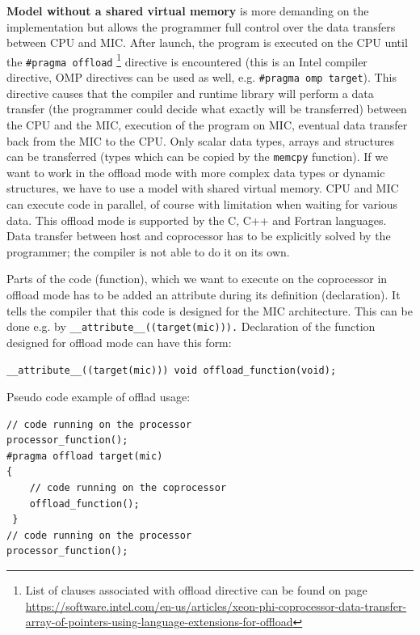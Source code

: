 \par \textbf{Model without a shared virtual memory} is more demanding on the implementation but allows the programmer full control over the data transfers between CPU and MIC. After launch, the program is executed on the CPU until the \texttt{\#pragma offload} \footnote{List of clauses associated with offload directive can be found on page
\url{https://software.intel.com/en-us/articles/xeon-phi-coprocessor-data-transfer-array-of-pointers-using-language-extensions-for-offload}} directive is encountered (this is an Intel compiler directive, OMP directives can be used as well, e.g. \texttt{\#pragma omp target}). This directive causes that the compiler and runtime library will perform a data transfer (the programmer could decide what exactly will be transferred) between the CPU and the MIC, execution of the program on MIC, eventual data transfer back from the MIC to the CPU. Only scalar data types, arrays and structures can be transferred (types which can be copied by the \texttt{memcpy} function). If we want to work in the offload mode with more complex data types or dynamic structures, we have to use a model with shared virtual memory. CPU and MIC can execute code in parallel, of course with limitation when waiting for various data. This offload mode is supported by the C, C++ and Fortran languages. Data transfer between host and coprocessor has to be explicitly solved by the programmer; the compiler is not able to do it on its own.

\par Parts of the code (function), which we want to execute on the coprocessor in offload mode has to be added an attribute during its definition (declaration). It tells the compiler that this code is designed for the MIC architecture. This can be done e.g. by \texttt{\_\_attribute\_\_((target(mic))).}
Declaration of the function designed for offload mode can have this form:

\bigskip
\texttt{\_\_attribute\_\_((target(mic))) void offload\_function(void);}
\bigskip

Pseudo code example of offlad usage:

\bigskip
\begin{lstlisting}[caption=Example of offload mode usage, captionpos=b, label=code_offload_usage]
// code running on the processor
processor_function();
#pragma offload target(mic)
{
    // code running on the coprocessor
    offload_function();
 }
// code running on the processor
processor_function();
\end{lstlisting}
\bigskip

